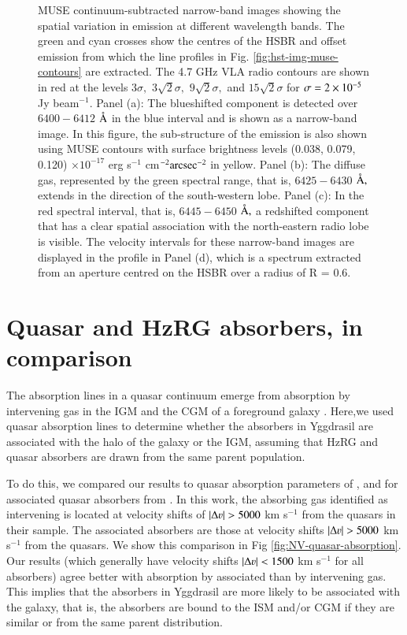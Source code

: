 \begin{figure}
\caption[MUSE  narrow-band images]{MUSE continuum-subtracted narrow-band images showing the spatial variation in  emission at different wavelength bands. The green and cyan crosses show the centres of the HSBR and offset  emission from which the line profiles in Fig. \ref{fig:hst-img-muse-contours} are extracted. The 4.7 GHz VLA radio contours are shown in red at the levels $3\sigma,$ $3\sqrt{2}\sigma,$ $9\sqrt{2}\sigma,$ and $15\sqrt{2}\sigma$ for $\sigma = 2\times 10^{-5}$ Jy beam$^{-1}$. Panel (a): The blueshifted component is detected over $6400 - 6412$ $\mbox{\normalfont\AA }$ in the blue interval and is shown as a narrow-band image. In this figure, the sub-structure of the emission is also shown using MUSE  contours with surface brightness levels (0.038, 0.079, 0.120) $\times 10^{-17}$ erg s$^{-1}$ cm$^{-2} {\rm arcsec}^{-2}$ in yellow. Panel (b): The diffuse  gas, represented by the green spectral range, that is, $6425 - 6430$ $\mbox{\normalfont\AA },$ extends in the direction of the south-western lobe. Panel (c): In the red spectral interval, that is, $6445 - 6450$ $\mbox{\normalfont\AA },$ a redshifted component that has a clear spatial association with the north-eastern radio lobe is visible. The velocity intervals for these narrow-band images are displayed in the  profile in Panel (d), which is a spectrum extracted from an aperture centred on the HSBR over a radius of R = 0.6\arcsec. }
\label{fig:0943-emission}
\end{figure}

\section{Quasar and HzRG absorbers, in comparison}\label{section:hzrg-vs-quasar-abs}
The absorption lines in a quasar continuum emerge from absorption by intervening gas in the IGM and the CGM of a foreground galaxy \citep[e.g.][]{bechtold2001}. Here,we used quasar absorption lines to determine whether the absorbers in Yggdrasil are associated with the halo of the galaxy or the IGM, assuming that HzRG and quasar absorbers are drawn from the same parent population. 

To do this, we compared our results to quasar absorption parameters of ,  and  for associated quasar absorbers from \citet{fechner2009}. In this work, the absorbing gas identified as intervening is located at velocity shifts of $\lvert \Delta \varv \rvert > 5000$ km s$^{-1}$ from the quasars in their sample. The  associated absorbers are those at velocity shifts $\lvert \Delta \varv \rvert > 5000$ km s$^{-1}$ from the quasars. We show this comparison in Fig \ref{fig:NV-quasar-absorption}. Our results (which generally have velocity shifts $\lvert \Delta \varv \rvert < 1500$ km s$^{-1}$ for all absorbers) agree better with absorption by associated than by intervening gas. This implies that the absorbers in Yggdrasil are more likely to be associated with the galaxy, that is, the absorbers are bound to the ISM and/or CGM if they are similar or from the same parent distribution.

